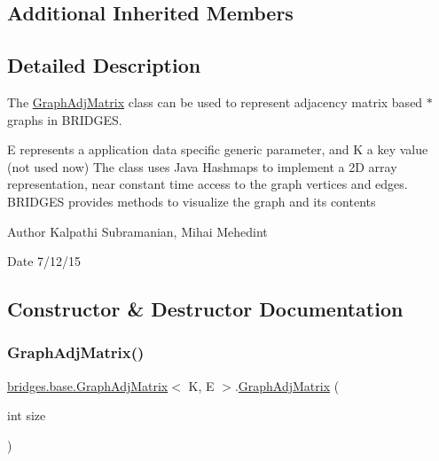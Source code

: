 \subsection*{Additional Inherited Members}


\subsection{Detailed Description}
The \hyperlink{classbridges_1_1base_1_1_graph_adj_matrix}{Graph\+Adj\+Matrix} class can be used to represent adjacency matrix based $\ast$ graphs in B\+R\+I\+D\+G\+ES. 

E represents a application data specific generic parameter, and K a key value (not used now) The class uses Java Hashmaps to implement a 2D array representation, near constant time access to the graph vertices and edges. B\+R\+I\+D\+G\+ES provides methods to visualize the graph and its contents

\begin{DoxyAuthor}{Author}
Kalpathi Subramanian, Mihai Mehedint 
\end{DoxyAuthor}
\begin{DoxyDate}{Date}
7/12/15 
\end{DoxyDate}


\subsection{Constructor \& Destructor Documentation}
\hypertarget{classbridges_1_1base_1_1_graph_adj_matrix_aaf71e89e2239d42f3ef37570665fb49d}{}\label{classbridges_1_1base_1_1_graph_adj_matrix_aaf71e89e2239d42f3ef37570665fb49d} 
\subsubsection{\texorpdfstring{Graph\+Adj\+Matrix()}{GraphAdjMatrix()}}
{\footnotesize\ttfamily \hyperlink{classbridges_1_1base_1_1_graph_adj_matrix}{bridges.\+base.\+Graph\+Adj\+Matrix}$<$ K, E $>$.\hyperlink{classbridges_1_1base_1_1_graph_adj_matrix}{Graph\+Adj\+Matrix} (\begin{DoxyParamCaption}\item[{int}]{size }\end{DoxyParamCaption})}

